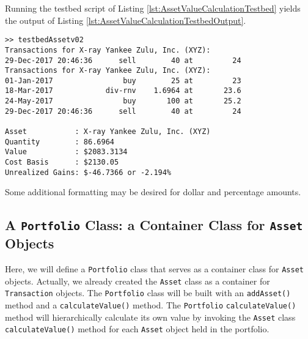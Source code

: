 Running the testbed script of Listing \ref{lst:AssetValueCalculationTestbed} yields the output of Listing \ref{lst:AssetValueCalculationTestbedOutput}.
\begin{lstlisting}[style=Matlab-editor, caption={Output for the testbed function of Listing \ref{lst:AssetValueCalculationTestbed}.}, label={lst:AssetValueCalculationTestbedOutput}]
>> testbedAssetv02
Transactions for X-ray Yankee Zulu, Inc. (XYZ):
29-Dec-2017 20:46:36      sell        40 at         24
Transactions for X-ray Yankee Zulu, Inc. (XYZ):
01-Jan-2017                buy        25 at         23
18-Mar-2017            div-rnv    1.6964 at       23.6
24-May-2017                buy       100 at       25.2
29-Dec-2017 20:46:36      sell        40 at         24

Asset           : X-ray Yankee Zulu, Inc. (XYZ)
Quantity        : 86.6964
Value           : $2083.3134
Cost Basis      : $2130.05
Unrealized Gains: $-46.7366 or -2.194%
\end{lstlisting}
Some additional formatting may be desired for dollar and percentage amounts.

\subsection{A \texttt{Portfolio} Class: a Container Class for \texttt{Asset} Objects}

Here, we will define a \texttt{Portfolio} class that serves as a container class for \texttt{Asset} objects. Actually, we already created the \texttt{Asset} class as a container for \texttt{Transaction} objects. The \texttt{Portfolio} class will be built with an \texttt{addAsset()} method and a \texttt{calculateValue()} method. The \texttt{Portfolio} \texttt{calculateValue()} method will hierarchically calculate its own value by invoking the \texttt{Asset} class \texttt{calculateValue()} method for each \texttt{Asset} object held in the portfolio.

